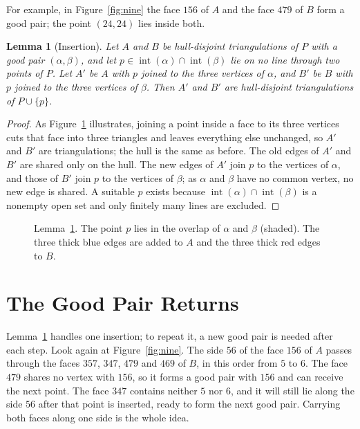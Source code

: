 \documentclass[11pt]{amsart}
\newtheorem{lemma}[theorem]{Lemma}
\theoremstyle{definition}
\newcommand{\inter}{\operatorname{int}}
\begin{document}
For example, in Figure~\ref{fig:nine} the face $156$ of $A$ and the face $479$ of $B$ form a good pair; the point $(24,24)$ lies inside both.

\begin{lemma}[Insertion]\label{lem:insert}
Let $A$ and $B$ be hull-disjoint triangulations of $P$ with a good pair $(\alpha,\beta)$, and let $p\in\inter(\alpha)\cap\inter(\beta)$ lie on no line through two points of $P$. Let $A'$ be $A$ with $p$ joined to the three vertices of $\alpha$, and $B'$ be $B$ with $p$ joined to the three vertices of $\beta$. Then $A'$ and $B'$ are hull-disjoint triangulations of $P\cup\{p\}$.
\end{lemma}

\begin{proof}
As Figure~\ref{fig:insert} illustrates, joining a point inside a face to its three vertices cuts that face into three triangles and leaves everything else unchanged, so $A'$ and $B'$ are triangulations; the hull is the same as before. The old edges of $A'$ and $B'$ are shared only on the hull. The new edges of $A'$ join $p$ to the vertices of $\alpha$, and those of $B'$ join $p$ to the vertices of $\beta$; as $\alpha$ and $\beta$ have no common vertex, no new edge is shared. A suitable $p$ exists because $\inter(\alpha)\cap\inter(\beta)$ is a nonempty open set and only finitely many lines are excluded.
\end{proof}

\begin{figure}[t]
\centering
\caption{Lemma~\ref{lem:insert}. The point $p$ lies in the overlap of $\alpha$ and $\beta$ (shaded). The three thick blue edges are added to $A$ and the three thick red edges to $B$.}\label{fig:insert}
\end{figure}

\section{The Good Pair Returns}\label{sec:regen}

Lemma~\ref{lem:insert} handles one insertion; to repeat it, a new good pair is needed after each step. Look again at Figure~\ref{fig:nine}. The side $56$ of the face $156$ of $A$ passes through the faces $357$, $347$, $479$ and $469$ of $B$, in this order from $5$ to $6$. The face $479$ shares no vertex with $156$, so it forms a good pair with $156$ and can receive the next point. The face $347$ contains neither $5$ nor $6$, and it will still lie along the side $56$ after that point is inserted, ready to form the next good pair. Carrying both faces along one side is the whole idea.
\end{document}
